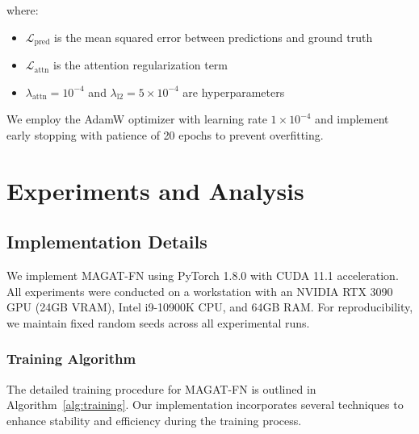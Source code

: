 \documentclass[lettersize, journal]{IEEEtran}
\begin{document}
where:
\begin{itemize}
    \item $\mathcal{L}_{\text{pred}}$ is the mean squared error between predictions and ground truth
    \item $\mathcal{L}_{\text{attn}}$ is the attention regularization term
    \item $\lambda_{\text{attn}} = 10^{-4}$ and $\lambda_{\text{l2}} = 5 \times 10^{-4}$ are hyperparameters
\end{itemize}

We employ the AdamW optimizer with learning rate $1 \times 10^{-4}$ and implement early stopping with patience of 20 epochs to prevent overfitting.

\section{Experiments and Analysis}

\subsection{Implementation Details}
We implement MAGAT-FN using PyTorch 1.8.0 with CUDA 11.1 acceleration. All experiments were conducted on a workstation with an NVIDIA RTX 3090 GPU (24GB VRAM), Intel i9-10900K CPU, and 64GB RAM. For reproducibility, we maintain fixed random seeds across all experimental runs.

\subsubsection{Training Algorithm}
The detailed training procedure for MAGAT-FN is outlined in Algorithm~\ref{alg:training}. Our implementation incorporates several techniques to enhance stability and efficiency during the training process.
\end{document}

